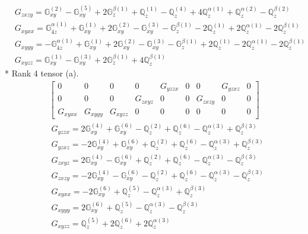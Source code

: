 \documentclass[fleqn,8pt,landscape]{jsarticle}
\begin{document}
\begin{align*}
& G_{zxzy} = \mathbb{G}_{xy}^{(2)} - \mathbb{G}_{xy}^{(5)} + 2 \mathbb{G}_{z}^{\beta(1)} + \mathbb{Q}_{z}^{(1)} - \mathbb{Q}_{z}^{(4)} + 4 \mathbb{Q}_{z}^{\alpha(1)} + \mathbb{Q}_{z}^{\alpha(2)} - \mathbb{Q}_{z}^{\beta(2)} \\
& G_{xyxx} = \mathbb{G}_{4z}^{\alpha(1)} + \mathbb{G}_{xy}^{(1)} + 2 \mathbb{G}_{xy}^{(2)} - \mathbb{G}_{xy}^{(3)} - \mathbb{G}_{z}^{\beta(1)} - 2 \mathbb{Q}_{z}^{(1)} + 2 \mathbb{Q}_{z}^{\alpha(1)} - 2 \mathbb{Q}_{z}^{\beta(1)} \\
& G_{xyyy} = - \mathbb{G}_{4z}^{\alpha(1)} + \mathbb{G}_{xy}^{(1)} + 2 \mathbb{G}_{xy}^{(2)} - \mathbb{G}_{xy}^{(3)} - \mathbb{G}_{z}^{\beta(1)} + 2 \mathbb{Q}_{z}^{(1)} - 2 \mathbb{Q}_{z}^{\alpha(1)} - 2 \mathbb{Q}_{z}^{\beta(1)} \\
& G_{xyzz} = \mathbb{G}_{xy}^{(1)} - \mathbb{G}_{xy}^{(3)} + 2 \mathbb{G}_{z}^{\beta(1)} + 4 \mathbb{Q}_{z}^{\beta(1)}
\end{align*}
* Rank 4 tensor (a).
\begin{align*}
\begin{bmatrix} 0 & 0 & 0 & 0 & G_{yzzx} & 0 & 0 & G_{yzxz} & 0 \\ 0 & 0 & 0 & G_{zxyz} & 0 & 0 & G_{zxzy} & 0 & 0 \\ G_{xyxx} & G_{xyyy} & G_{xyzz} & 0 & 0 & 0 & 0 & 0 & 0 \end{bmatrix}
\end{align*}
\begin{align*}
& G_{yzzx} = 2 \mathbb{G}_{xy}^{(4)} + \mathbb{G}_{xy}^{(6)} - \mathbb{Q}_{z}^{(2)} + \mathbb{Q}_{z}^{(6)} - \mathbb{Q}_{z}^{\alpha(3)} + \mathbb{Q}_{z}^{\beta(3)} \\
& G_{yzxz} = - 2 \mathbb{G}_{xy}^{(4)} + \mathbb{G}_{xy}^{(6)} + \mathbb{Q}_{z}^{(2)} + \mathbb{Q}_{z}^{(6)} - \mathbb{Q}_{z}^{\alpha(3)} + \mathbb{Q}_{z}^{\beta(3)} \\
& G_{zxyz} = 2 \mathbb{G}_{xy}^{(4)} - \mathbb{G}_{xy}^{(6)} + \mathbb{Q}_{z}^{(2)} + \mathbb{Q}_{z}^{(6)} - \mathbb{Q}_{z}^{\alpha(3)} - \mathbb{Q}_{z}^{\beta(3)} \\
& G_{zxzy} = - 2 \mathbb{G}_{xy}^{(4)} - \mathbb{G}_{xy}^{(6)} - \mathbb{Q}_{z}^{(2)} + \mathbb{Q}_{z}^{(6)} - \mathbb{Q}_{z}^{\alpha(3)} - \mathbb{Q}_{z}^{\beta(3)} \\
& G_{xyxx} = - 2 \mathbb{G}_{xy}^{(6)} + \mathbb{Q}_{z}^{(5)} - \mathbb{Q}_{z}^{\alpha(3)} + \mathbb{Q}_{z}^{\beta(3)} \\
& G_{xyyy} = 2 \mathbb{G}_{xy}^{(6)} + \mathbb{Q}_{z}^{(5)} - \mathbb{Q}_{z}^{\alpha(3)} - \mathbb{Q}_{z}^{\beta(3)} \\
& G_{xyzz} = \mathbb{Q}_{z}^{(5)} + 2 \mathbb{Q}_{z}^{(6)} + 2 \mathbb{Q}_{z}^{\alpha(3)}
\end{align*}
\end{document}
